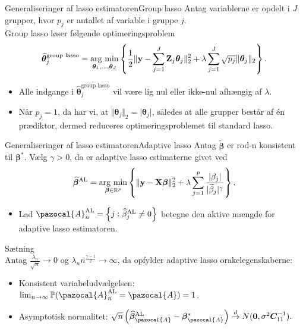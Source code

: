 \begin{frame}{Generaliseringer af lasso estimatoren}{Group lasso}
Antag variablerne er opdelt i \(J\) grupper, hvor \(p_j\) er antallet af variable i gruppe \(j\). \\

Group lasso løser følgende optimeringsproblem
\begin{align*}
\widehat{\boldsymbol{\theta}}_j^{\text{group lasso}} = \argmin_{\boldsymbol{\theta}_1, \ldots, \boldsymbol{\theta}_J} \cbr{\frac{1}{2} \Vert \mathbf{y} - \sum_{j=1}^J \mathbf{Z}_j \boldsymbol{\theta}_j \Vert_2^2 + \lambda \sum_{j=1}^J \sqrt{p_j} \Vert \boldsymbol{\theta}_j \Vert_2}.
\end{align*}
\begin{itemize}
\item Alle indgange i $\widehat{\boldsymbol{\theta}}_j^\text{group lasso}$ vil være lig nul eller ikke-nul afhængig af \(\lambda\).
\item Når $p_j=1$, da har vi, at $\Vert \boldsymbol{\theta}_j \Vert_2 = \vert \boldsymbol{\theta}_j \vert$, således at alle grupper består af én prædiktor, dermed reduceres optimeringsproblemet til standard lasso.
\end{itemize}
\end{frame}
%
\begin{frame}{Generaliseringer af lasso estimatoren}{Adaptive lasso}
Antag \(\widetilde{\boldsymbol{\beta}}\) er rod-n konsistent til \(\boldsymbol{\beta}^*\). Vælg \(\gamma >0\), da er adaptive lasso estimaterne givet ved
\begin{align*}
\widehat{\boldsymbol{\beta}}^\text{AL} = \argmin_{\boldsymbol{\beta} \in \R^p} \cbr{ \Vert \mathbf{y} - \mathbf{X} \boldsymbol{\beta} \Vert_2^2 + \lambda \sum_{j=1}^p \frac{ \vert \beta_j \vert}{\vert \widetilde{ \beta}_j \vert^\gamma}}.
\end{align*}
\begin{itemize}
\item Lad $\pazocal{A}_n^\text{AL} = \cbr{j: \widehat{\beta}_j^\text{AL} \neq 0}$ betegne den aktive mængde for adaptive lasso estimatoren.
\end{itemize} 
Sætning \\
Antag $\frac{\lambda_n}{\sqrt{n}} \rightarrow 0$ og $\lambda_n n^\frac{\gamma - 1}{2} \rightarrow \infty$, da opfylder adaptive lasso orakelegenskaberne:
\begin{itemize}
\item Konsistent variabeludvælgelsen: $\lim_{n \rightarrow \infty} \mathbb{P}(\pazocal{A}_n^\text{AL}=\pazocal{A})=1$.
\item Asymptotisk normalitet: $\sqrt{n}\left( \widehat{\boldsymbol{\beta}}_\pazocal{A}^{\text{AL}}-\boldsymbol{\beta}_\pazocal{A}^* \right) \overset{d}{\rightarrow} N(\textbf{0},\sigma^2 \boldsymbol{C}_{11}^{-1}).$
\end{itemize} 
\end{frame}

